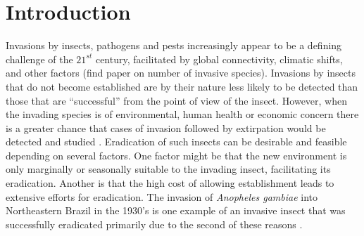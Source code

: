 \documentclass[10pt,a4paper,twocolumn]{article}
\begin{document}






\section*{Introduction}

Invasions by insects, pathogens and pests increasingly appear to be a 
defining challenge of the $21^{st}$ century, facilitated by global connectivity, climatic shifts, and
other factors \cite{simberloff_impacts_2013} (find paper on number of invasive species). Invasions by insects that do not become established are by their nature less
likely to be detected than those that are ``successful''
from the point of view of the insect. However, when the invading species
is of  environmental, human health or economic concern there is a greater
chance that cases of invasion followed by extirpation would be detected and
studied \citep{liebhold_population_2008}. Eradication of such insects
can be desirable and feasible \citep{Myers2000Eradication} depending on several
factors. One factor might be that the new environment is only marginally or 
seasonally suitable to the
invading insect, facilitating its eradication. Another is that the high cost of
allowing establishment leads
to extensive efforts for eradication. The invasion of
\emph{Anopheles gambiae} into Northeastern Brazil in the 1930's \citep{Soper1943Anopheles}
is one example of an invasive insect that was successfully eradicated 
primarily due to the second of these
reasons \citep{Causey1943Ecology,Killeen2002Eradication}.
\end{document}
